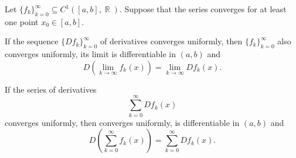 \begin{corollary}\label{thm:derivative_limit_exchange}
  Let \( \{ f_k \}_{k=0}^\infty \subseteq C^1([a, b], \BbbR) \). Suppose that the series  converges for at least one point \( x_0 \in [a, b] \).

  \begin{thmenum}
     If the sequence \( \{ D f_k \}_{k=0}^\infty \) of derivatives converges uniformly, then \( \{ f_k \}_{k=0}^\infty \) also converges uniformly, its limit is differentiable in \( (a, b) \) and
    \begin{equation*}
      D\left(\lim_{k \to \infty} f_k(x) \right) = \lim_{k \to \infty} D f_k(x).
    \end{equation*}

     If the series of derivatives
    \begin{equation}\label{thm:derivative_limit_exchange/derivative_series}
      \sum_{k=0}^\infty D f_k(x)
    \end{equation}
    converges uniformly, then  converges uniformly, is differentiable in \( (a, b) \) and
    \begin{equation*}
      D\left(\sum_{k=0}^\infty f_k(x)\right) = \sum_{k=0}^\infty D f_k(x).
    \end{equation*}
  \end{thmenum}
\end{corollary}
